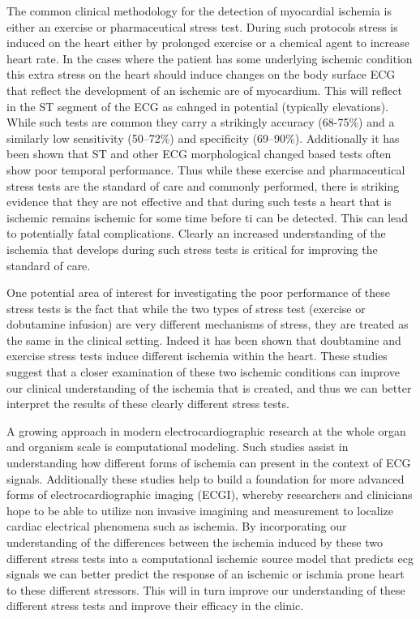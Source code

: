 \documentclass[12pt]{article}
\begin{document}
The common clinical methodology for the detection of myocardial ischemia is either an exercise or pharmaceutical stress test.\cite{Zenger2019,Beleslin1994} During such protocols stress is induced on the heart either by prolonged exercise or a chemical agent to increase heart rate. In the cases where the patient has some underlying ischemic condition this extra stress on the heart should induce changes on the body surface ECG that reflect the development of an ischemic are of myocardium. This will reflect in the ST segment of the ECG as cahnged in potential (typically elevations). While such tests are common they carry a strikingly accuracy (68-75\%) and a similarly low sensitivity (50--72\%) and specificity (69--90\%).\cite{BLZ:Knu2018a,RSM:Ste2002,BMB:Akk2011} Additionally it has been shown that ST and other ECG morphological changed based tests often show poor temporal performance.\cite{RSM:Goo2018} Thus while these exercise and pharmaceutical stress tests are the standard of care and commonly performed, there is striking evidence that they are not effective and that during such tests a heart that is ischemic remains ischemic for some time before ti can be detected. This can lead to potentially fatal complications. Clearly an increased understanding of the ischemia that develops during such stress tests is critical for improving the standard of care.

One potential area of interest for investigating the poor performance of these stress tests is the fact that while the two types of stress test (exercise or dobutamine infusion) are very different mechanisms of stress, they are treated as the same in the clinical setting. Indeed it has been shown that doubtamine and exercise stress tests induce different ischemia within the heart.\cite{Beleslin1994,Zenger2019} These studies suggest that a closer examination of these two ischemic conditions can improve our clinical understanding of the ischemia that is created, and thus we can better interpret the results of these clearly different stress tests.

A growing approach in modern electrocardiographic research at the whole organ and organism scale is computational modeling.\cite{RSM:Bur2018b} Such studies assist in understanding how different forms of ischemia can present in the context of ECG signals. Additionally these studies help to build a foundation for more advanced forms of electrocardiographic imaging (ECGI), whereby researchers and clinicians hope to be able to utilize non invasive imagining and measurement to localize cardiac electrical phenomena such as ischemia. By incorporating our understanding of the differences between the ischemia induced by these two different stress tests into a computational ischemic source model that predicts ecg signals we can better predict the response of an ischemic or ischmia prone heart to these different stressors. This will in turn improve our understanding of these different stress tests and improve their efficacy in the clinic.
\end{document}
